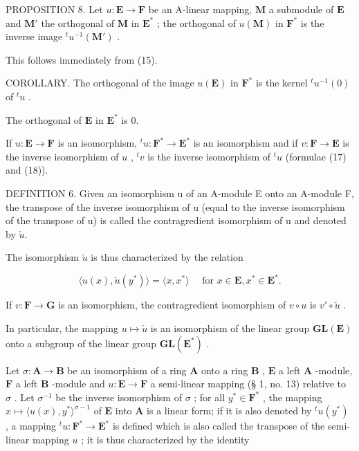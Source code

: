 PROPOSITION 8. Let \(u: \mathbf{E} \to \mathbf{F}\) be an A-linear mapping, \(\mathbf{M}\) a submodule of \(\mathbf{E}\) and \(\mathbf{M}'\) the orthogonal of \(\mathbf{M}\) in \(\mathbf{E}^*\) ; the orthogonal of \(u(\mathbf{M})\) in \(\mathbf{F}^*\) is the inverse image \(^t u^{-1}(\mathbf{M}')\) .

This follows immediately from (15).

COROLLARY. The orthogonal of the image \(u(\mathbf{E})\) in \(\mathbf{F}^*\) is the kernel \({}^t u^{-1}(0)\) of \({}^t u\) .

The orthogonal of \(\mathbf{E}\) in \(\mathbf{E}^*\) is 0.

If \(u: \mathbf{E} \to \mathbf{F}\) is an isomorphism, \({}^{t}u: \mathbf{F}^{*} \to \mathbf{E}^{*}\) is an isomorphism and if \(v: \mathbf{F} \to \mathbf{E}\) is the inverse isomorphism of \(u\) , \({}^{t}v\) is the inverse isomorphism of \({}^{t}u\) (formulae (17) and (18)).

DEFINITION 6. Given an isomorphism u of an A-module E onto an A-module F, the transpose of the inverse isomorphism of u (equal to the inverse isomorphism of the transpose of u) is called the contragredient isomorphism of u and denoted by \(\check{u}\).

The isomorphism \(\check{u}\) is thus characterized by the relation

\[
\langle u (x), \check {u} (y ^ {*}) \rangle = \langle x, x ^ {*} \rangle \quad \text { for } x \in \mathbf {E}, x ^ {*} \in \mathbf {E} ^ {*}.\tag{19}
\]

If \(v: \mathbf{F} \to \mathbf{G}\) is an isomorphism, the contragredient isomorphism of \(v \circ u\) is \(v' \circ \check{u}\) .

In particular, the mapping \(u \mapsto \check{u}\) is an isomorphism of the linear group \(\mathbf{GL}(\mathbf{E})\) onto a subgroup of the linear group \(\mathbf{GL}(\mathbf{E}^*)\) .

Let \(\sigma: \mathbf{A} \to \mathbf{B}\) be an isomorphism of a ring \(\mathbf{A}\) onto a ring \(\mathbf{B}\) , \(\mathbf{E}\) a left \(\mathbf{A}\) -module, \(\mathbf{F}\) a left \(\mathbf{B}\) -module and \(u: \mathbf{E} \to \mathbf{F}\) a semi-linear mapping (§ 1, no. 13) relative to \(\sigma\) . Let \(\sigma^{-1}\) be the inverse isomorphism of \(\sigma\) ; for all \(y^{*} \in \mathbf{F}^{*}\) , the mapping \(x \mapsto \langle u(x), y^{*} \rangle^{\sigma - 1}\) of \(\mathbf{E}\) into \(\mathbf{A}\) is a linear form; if it is also denoted by \(^t u(y^*)\) , a mapping \(^t u: \mathbf{F}^{*} \to \mathbf{E}^{*}\) is defined which is also called the transpose of the semi-linear mapping \(u\) ; it is thus characterized by the identity

